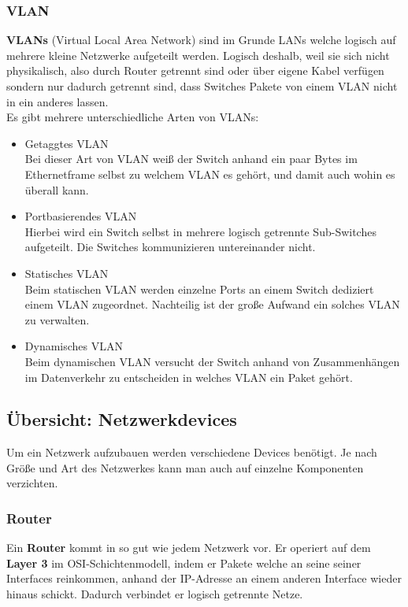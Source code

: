 \documentclass[12pt,a4paper]{report}
\begin{document}
\subsubsection{VLAN}\label{sssec:vlan}
\textbf{VLANs} (Virtual Local Area Network) sind im Grunde LANs welche logisch auf mehrere kleine Netzwerke aufgeteilt werden. Logisch deshalb, weil sie sich nicht physikalisch, also durch Router getrennt sind oder über eigene Kabel verfügen sondern nur dadurch getrennt sind, dass Switches Pakete von einem VLAN nicht in ein anderes lassen.\\
Es gibt mehrere unterschiedliche Arten von VLANs:\\
\begin{itemize}
\item Getaggtes VLAN\\
Bei dieser Art von VLAN weiß der Switch anhand ein paar Bytes im Ethernetframe selbst zu welchem VLAN es gehört, und damit auch wohin es überall kann.
\item Portbasierendes VLAN\\
Hierbei wird ein Switch selbst in mehrere logisch getrennte Sub-Switches aufgeteilt. Die Switches kommunizieren untereinander nicht.
\item Statisches VLAN\\
Beim statischen VLAN werden einzelne Ports an einem Switch dediziert einem VLAN zugeordnet. Nachteilig ist der große Aufwand ein solches VLAN zu verwalten.
\item Dynamisches VLAN\\
Beim dynamischen VLAN versucht der Switch anhand von Zusammenhängen im Datenverkehr zu entscheiden in welches VLAN ein Paket gehört. 
\end{itemize}
\subsection{Übersicht: Netzwerkdevices}
Um ein Netzwerk aufzubauen werden verschiedene Devices benötigt. Je nach Größe und Art des Netzwerkes kann man auch auf einzelne Komponenten verzichten. 
\subsubsection{Router}
Ein \textbf{Router} kommt in so gut wie jedem Netzwerk vor. Er operiert auf dem \textbf{Layer 3} im OSI-Schichtenmodell, indem er Pakete welche an seine seiner Interfaces reinkommen, anhand der IP-Adresse an einem anderen Interface wieder hinaus schickt. Dadurch verbindet er logisch getrennte Netze.\\
\end{document}
